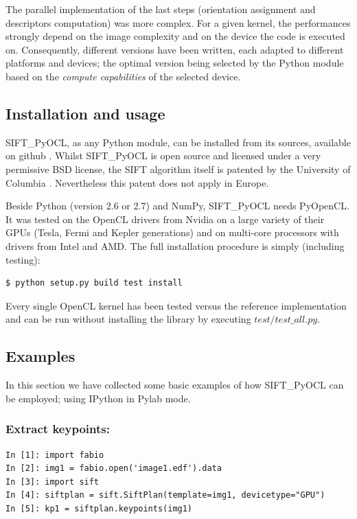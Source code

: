 \documentclass[preprint]{iucr}
\begin{document}
The parallel implementation of the last steps (orientation assignment and
descriptors computation) was more complex.
For a given kernel, the performances strongly depend on the image
complexity and on the device the code is executed on.
Consequently, different versions have been written, each adapted to
different platforms and
devices; the optimal version being selected by the
Python module based on the \emph{compute capabilities} of the selected device.


\subsection{Installation and usage}
SIFT\_PyOCL, as any Python module, can be installed from its sources,
available on github \cite{sift_pyocl}.
Whilst SIFT\_PyOCL is open source and licensed under a very
permissive BSD license, the SIFT algorithm itself is
patented by the University of Columbia \cite{SIFT_pat}.
Nevertheless this patent does not apply in Europe.

Beside Python (version 2.6 or 2.7) and NumPy, SIFT\_PyOCL needs
PyOpenCL.
It was tested on the OpenCL drivers from Nvidia on a
large variety of their GPUs (Tesla, Fermi and Kepler generations) and on
multi-core processors with drivers from Intel and AMD.
The full installation procedure is simply (including testing):
\begin{verbatim}
$ python setup.py build test install
\end{verbatim}
Every single OpenCL kernel has been tested versus the reference
implementation and can be run without installing the library by
executing $test/test\_all.py$.

\subsection{Examples}

In this section we have collected some basic examples of how
SIFT\_PyOCL can be employed; using IPython \cite{ipython} in
Pylab \cite{matplotlib} mode.

\subsubsection{Extract keypoints:}
\begin{verbatim}
In [1]: import fabio
In [2]: img1 = fabio.open('image1.edf').data
In [3]: import sift
In [4]: siftplan = sift.SiftPlan(template=img1, devicetype="GPU")
In [5]: kp1 = siftplan.keypoints(img1)
\end{verbatim}
\end{document}
